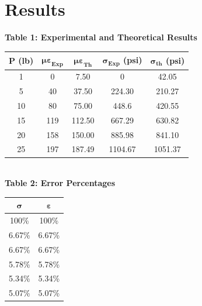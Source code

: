 \documentclass{article}
\begin{document}
    \section{Results}
    \doublespacing
    \begin{center}
    {\large{\bf Table 1: Experimental and Theoretical Results\\}}
    \vspace{3mm}
    \begin{tabular}{|c c c c c|}
        \hline
        \textbf{P (lb)} & \(\bm{\mu\varepsilon}_\textbf{Exp}\) & \(\bm{\mu\varepsilon}_\textbf{Th}\) & \(\bm{\sigma}_\textbf{Exp}\)\textbf{ (psi)} & \(\bm{\sigma}_\textbf{th}\)\textbf{ (psi)}\\ \hline
        1&  0&      7.50&       0&          42.05\\
        5&  40&     37.50&      224.30&     210.27\\
        10& 80&     75.00&      448.6&      420.55\\
        15& 119&    112.50&     667.29&     630.82\\
        20& 158&    150.00&     885.98&     841.10\\
        25& 197&    187.49&    1104.67&    1051.37\\\hline
    \end{tabular}
    \vspace{5 mm}
    {\large{\bf \\Table 2: Error Percentages\\}}
    \vspace{3mm}
    \begin{tabular}{|c c|}
        \hline
        \(\bm{\sigma}\) & \(\bm{\varepsilon}\) \\\hline
        100\% & 100\% \\
        6.67\% & 6.67\% \\
        6.67\% & 6.67\% \\
        5.78\% & 5.78\% \\
        5.34\% & 5.34\% \\
        5.07\% & 5.07\% \\
        \hline
    \end{tabular}
    \end{center}
    \newpage
    \newpage
\end{document}
